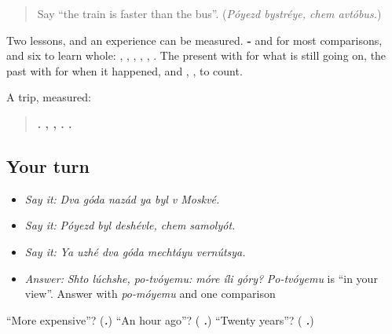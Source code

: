 \label{lesson:RU-C268-review}



\begin{quote}
Say \textquotedblleft{}the train is faster than the bus\textquotedblright{}. (\emph{Póyezd bystréye, chem avtóbus.})
\end{quote}

\begin{grammarlens}[title={What you've built}]
Two lessons, and an experience can be measured. \textbf{-} and \textbf{} for most comparisons, and six to learn whole: \textbf{}, \textbf{}, \textbf{}, \textbf{}, \textbf{}, \textbf{}. The present with \textbf{} for what is still going on, the past with \textbf{} for when it happened, and \textbf{}, \textbf{}, \textbf{} to count.

A trip, measured:

\begin{quote}
\textbf{      .   ,  ,    .      .}
\end{quote}
\end{grammarlens}

\subsection*{Your turn}
\begin{itemize}
\raggedright
  \item \emph{Say it:} \emph{Dva góda nazád ya byl v Moskvé.}
  \item \emph{Say it:} \emph{Póyezd byl deshévle, chem samolyót.}
  \item \emph{Say it:} \emph{Ya uzhé dva góda mechtáyu vernútsya.}
  \item \emph{Answer:} \emph{Shto lúchshe, po-tvóyemu: móre íli góry?} \emph{Po-tvóyemu} is \textquotedblleft{}in your view\textquotedblright{}. Answer with \emph{po-móyemu} and one comparison
\end{itemize}

\begin{tcolorbox}[breakable,colback=teal!4,colframe=teal!35!black,title={Before you move on}]
\textquotedblleft{}More expensive\textquotedblright{}? (\emph{\textbf{.}}) \textquotedblleft{}An hour ago\textquotedblright{}? (\emph{\textbf{ .}}) \textquotedblleft{}Twenty years\textquotedblright{}? (\emph{\textbf{ .}})
\end{tcolorbox}
